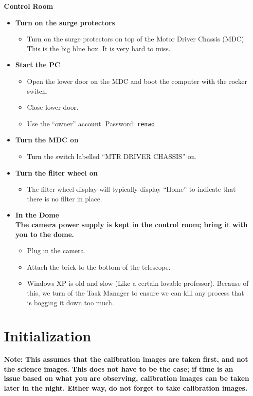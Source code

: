 \documentclass[letterpaper, 12pt]{report}
\begin{document}
{\large\textbf{Control Room}}
\begin{itemize}
	\item \textbf{Turn on the surge protectors}
	\begin{itemize}
		\item Turn on the surge protectors on top of the Motor Driver Chassis (MDC). This is the big blue box. It is very hard to miss.
	\end{itemize}
	\item \textbf{Start the PC}
	\begin{itemize}
		\item Open the lower door on the MDC and boot the computer with the rocker switch.
		\item Close lower door.
		\item Use the ``owner'' account. Password: \texttt{renwo}
	\end{itemize}
	\item \textbf{Turn the MDC on}
	\begin{itemize}
		\item Turn the switch labelled ``MTR DRIVER CHASSIS'' on.
	\end{itemize}
	\item \textbf{Turn the filter wheel on}
	\begin{itemize}
		\item The filter wheel display will typically display ``Home'' to indicate that there is no filter in place.
	\end{itemize}
	\item \textbf{In the Dome} \\
	\noindent \textbf{The camera power supply is kept in the control room; bring it with you to the dome.}
	\begin{itemize}
		\item Plug in the camera.
		\item Attach the brick to the bottom of the telescope.
	\end{itemize}
	\begin{itemize}
		\item Windows XP is old and slow (Like a certain lovable professor). Because of this, we turn of the Task Manager to ensure we can kill any process that is bogging it down too much.
	\end{itemize}
\end{itemize}

\newpage



\chapter{Initialization}\label{ch:initialization}
\textbf{Note: This assumes that the calibration images are taken first, and not the science images. This does not have to be the case; if time is an issue based on what you are observing, calibration images can be taken later in the night. Either way, do not forget to take calibration images.} \\
\end{document}
